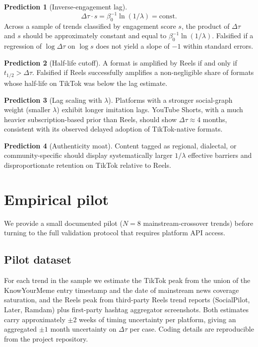 \documentclass[12pt,a4paper]{article}
\begin{document}
\textbf{Prediction 1} (Inverse-engagement lag).
\begin{equation}
  \Delta\tau \cdot s = \beta_0^{-1} \ln(1/\lambda) = \text{const.}
  \label{eq:pred1}
\end{equation}
Across a sample of trends classified by engagement score $s$, the product of $\Delta\tau$ and $s$ should be approximately constant and equal to $\beta_0^{-1} \ln(1/\lambda)$. Falsified if a regression of $\log \Delta\tau$ on $\log s$ does not yield a slope of $-1$ within standard errors.

\textbf{Prediction 2} (Half-life cutoff).
A format is amplified by Reels if and only if $t_{1/2} > \Delta\tau$. Falsified if Reels successfully amplifies a non-negligible share of formats whose half-life on TikTok was below the lag estimate.

\textbf{Prediction 3} (Lag scaling with $\lambda$).
Platforms with a stronger social-graph weight (smaller $\lambda$) exhibit longer imitation lags. YouTube Shorts, with a much heavier subscription-based prior than Reels, should show $\Delta\tau \approx 4$ months, consistent with its observed delayed adoption of TikTok-native formats.

\textbf{Prediction 4} (Authenticity moat).
Content tagged as regional, dialectal, or community-specific should display systematically larger $1/\lambda$ effective barriers and disproportionate retention on TikTok relative to Reels.

\section{Empirical pilot}
\label{sec:pilot}

We provide a small documented pilot ($N = 8$ mainstream-crossover trends) before turning to the full validation protocol that requires platform API access.

\subsection{Pilot dataset}

For each trend in the sample we estimate the TikTok peak from the union of the KnowYourMeme entry timestamp and the date of mainstream news coverage saturation, and the Reels peak from third-party Reels trend reports (SocialPilot, Later, Ramdam) plus first-party hashtag aggregator screenshots. Both estimates carry approximately $\pm 2$ weeks of timing uncertainty per platform, giving an aggregated $\pm 1$ month uncertainty on $\Delta\tau$ per case. Coding details are reproducible from the project repository.
\end{document}
